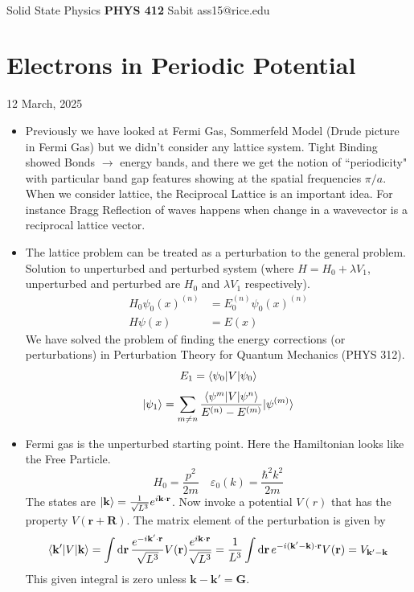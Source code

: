 \documentclass[11pt]{article}
\newcommand{\hb}{\hbar}
\renewcommand{\vec}{\mathbf}
\begin{document}
\thispagestyle{empty}
\bigskip \
\vspace{0.1cm}

\begin{center}
{\fontsize{22}{22} \selectfont Solid State Physics}
\vskip 16pt
{\fontsize{36}{36} \selectfont \bf \sffamily PHYS 412}
\vskip 24pt
{\fontsize{18}{18} \selectfont \rmfamily Sabit} 
\vskip 6pt
{\fontsize{14}{14} \selectfont \ttfamily ass15@rice.edu} 
\vskip 24pt
\end{center}

{\parindent0pt \baselineskip=15.5pt 



\newpage

\section*{Electrons in Periodic Potential}
12 March, 2025
\begin{itemize}
	\item Previously we have looked at Fermi Gas, Sommerfeld Model (Drude picture in Fermi Gas) but we didn't consider any lattice system. Tight Binding showed Bonds $\to $ energy bands, and there we get the notion of ``periodicity" with particular band gap features showing at the spatial frequencies $\pi / a$. When we consider lattice, the Reciprocal Lattice is an important idea. For instance Bragg Reflection of waves happens when change in a wavevector is a reciprocal lattice vector. 

	\item The lattice problem can be treated as a perturbation to the general problem. Solution to unperturbed and perturbed system (where $
			H = H_0 + \lambda V_1$, unperturbed and perturbed are $H_0$ and $\lambda V_1$ respectively).
		\begin{align*}
			H_0 \psi_0(x) ^{(n)} &= E_0 ^{(n)} \psi_0(x)^{(n)}\\
			H \psi(x) &= E(x)  
		\end{align*}
We have solved the problem of finding the energy corrections (or perturbations) in Perturbation Theory for Quantum Mechanics (PHYS 312). 
\[
E_1 = \langle\psi_0\rvert V \lvert\psi_0\rangle
\] 
\[
	\lvert\psi_1\rangle = \sum_{m \neq  n} \frac{\langle\psi^{m} \rvert V \lvert\psi^{n}\rangle }{E^{(n)} - E^{(m)} } \lvert\psi^{
	(m)}\rangle
\] 

\item Fermi gas is the unperturbed starting point. Here the Hamiltonian looks like the Free Particle.
	\[
	H_0 = \frac{p^2}{2m} \quad \varepsilon_0(k) = \frac{\hb ^2 k^2 }{2m}
	\] 
	The states are $\ket{\vec{k}} = \frac{1}{\sqrt{L^3} } e^{i \vec{k} \cdot  \vec{r}}$. Now invoke a potential $V(r)$ that has the property $V(\vec{r}+ \vec{R})$. The matrix element of the perturbation is given by 
	\[
	\bra{\vec{k} '} V \ket{\vec{k}} = \int \mathrm{d} \vec{r} \, 
\frac{e^{ - i \vec{k}' \cdot  \vec{r}}}{\sqrt{L^3}} V(\vec{r})
\frac{e^{  i \vec{k} \cdot  \vec{r}}}{\sqrt{L^3}} = \frac{1}{L^3} \int \mathrm{d} \vec{r} \, 
	e^{ - i (\vec{k} ' - \vec{k} ) \cdot  \vec{r}} V(\vec{r}) = V_{\vec{k}' - \vec{k}}
	\] 
This given integral is zero unless $\vec{k}  - \vec{k} '  = \vec{G}$. 


\end{itemize}}
\end{document}
